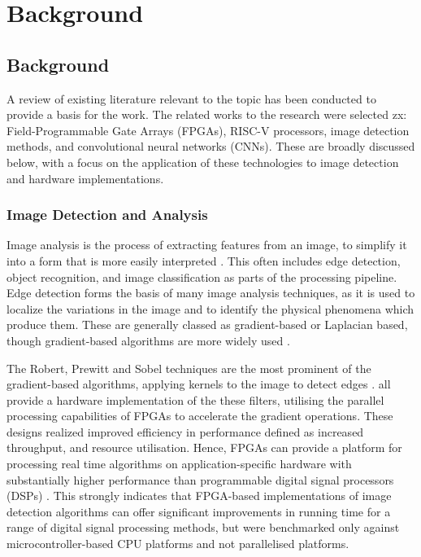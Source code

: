 \chapter[Background]{Background}

\label{Chap:Background}

\section{Background}
A review of existing literature relevant to the topic has been conducted to provide a basis for the work. 
The related works to the research were selected zx: Field-Programmable Gate Arrays (FPGAs), RISC-V processors, image detection methods, and convolutional neural networks (CNNs). 
These are broadly discussed below, with a focus on the application of these technologies to image detection and hardware implementations.


\subsection{Image Detection and Analysis}
Image analysis is the process of extracting features from an image, to simplify it into a form that is more easily interpreted \cite{Mathworks}.
This often includes edge detection, object recognition, and image classification as parts of the processing pipeline.
Edge detection forms the basis of many image analysis techniques, as it is used to localize the variations in the image and to identify the physical phenomena which produce them.
These are generally classed as gradient-based or Laplacian based, though gradient-based algorithms are more widely used \cite{Gradient}.

The Robert, Prewitt and Sobel techniques are the most prominent of the gradient-based algorithms, applying kernels to the image to detect edges \cite{Segmentation}.
\cite{XSG, Sobel, Canny, Aerial, Video} all provide a hardware implementation of the these filters, utilising the parallel processing capabilities of FPGAs to accelerate the gradient operations.
These designs realized improved efficiency in performance defined as increased throughput, and resource utilisation. 
Hence, FPGAs can provide a platform for processing real time algorithms on application-specific hardware with substantially higher performance than programmable digital signal processors (DSPs) \cite{RTEdge}.
This strongly indicates that FPGA-based implementations of image detection algorithms can offer significant improvements in running time for a range of digital signal processing methods, but were benchmarked only against microcontroller-based CPU platforms and not parallelised platforms.


